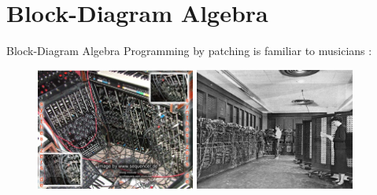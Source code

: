 
\section{Block-Diagram Algebra}

\begin{frame}[fragile]{Block-Diagram Algebra}
Programming by patching is familiar to musicians :

\begin{figure}[h]
\centering
\includegraphics[height=4cm]{images/moog}
\hspace{0.1cm}
\includegraphics[height=4cm]{images/eniac}
\label{figure:moog}
\end{figure}

\end{frame}


% 
% 


